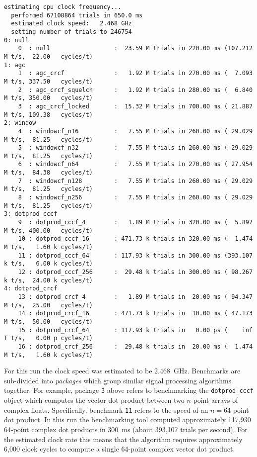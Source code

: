 \begin{Verbatim}[fontsize=\footnotesize]
  estimating cpu clock frequency...
  performed 67108864 trials in 650.0 ms
  estimated clock speed:   2.468 GHz
  setting number of trials to 246754
0: null
    0  : null                  :  23.59 M trials in 220.00 ms (107.212 M t/s,  22.00   cycles/t)
1: agc
    1  : agc_crcf              :   1.92 M trials in 270.00 ms (  7.093 M t/s, 337.50   cycles/t)
    2  : agc_crcf_squelch      :   1.92 M trials in 280.00 ms (  6.840 M t/s, 350.00   cycles/t)
    3  : agc_crcf_locked       :  15.32 M trials in 700.00 ms ( 21.887 M t/s, 109.38   cycles/t)
2: window
    4  : windowcf_n16          :   7.55 M trials in 260.00 ms ( 29.029 M t/s,  81.25   cycles/t)
    5  : windowcf_n32          :   7.55 M trials in 260.00 ms ( 29.029 M t/s,  81.25   cycles/t)
    6  : windowcf_n64          :   7.55 M trials in 270.00 ms ( 27.954 M t/s,  84.38   cycles/t)
    7  : windowcf_n128         :   7.55 M trials in 260.00 ms ( 29.029 M t/s,  81.25   cycles/t)
    8  : windowcf_n256         :   7.55 M trials in 260.00 ms ( 29.029 M t/s,  81.25   cycles/t)
3: dotprod_cccf
    9  : dotprod_cccf_4        :   1.89 M trials in 320.00 ms (  5.897 M t/s, 400.00   cycles/t)
    10 : dotprod_cccf_16       : 471.73 k trials in 320.00 ms (  1.474 M t/s,   1.60 k cycles/t)
    11 : dotprod_cccf_64       : 117.93 k trials in 300.00 ms (393.107 k t/s,   6.00 k cycles/t)
    12 : dotprod_cccf_256      :  29.48 k trials in 300.00 ms ( 98.267 k t/s,  24.00 k cycles/t)
4: dotprod_crcf
    13 : dotprod_crcf_4        :   1.89 M trials in  20.00 ms ( 94.347 M t/s,  25.00   cycles/t)
    14 : dotprod_crcf_16       : 471.73 k trials in  10.00 ms ( 47.173 M t/s,  50.00   cycles/t)
    15 : dotprod_crcf_64       : 117.93 k trials in   0.00 ps (    inf T t/s,   0.00 p cycles/t)
    16 : dotprod_crcf_256      :  29.48 k trials in  20.00 ms (  1.474 M t/s,   1.60 k cycles/t)
\end{Verbatim}
%
For this run the clock speed was estimated to be 2.468~GHz.
Benchmarks are sub-divided into {\em packages} which group similar
signal processing algorithms together.
For example, package {\tt 3} above refers to benchmarking the
{\tt dotprod\_cccf} object which computes the vector dot product
between two $n$-point arrays of complex floats.
Specifically, benchmark {\tt 11} refers to the speed of an $n=64$-point
dot product.
In this run the benchmarking tool computed approximately 117,930
64-point complex dot products in 300~ms
(about 393,107 trials per second).
For the estimated clock rate this means that the algorithm requires
approximately 6,000 clock cycles to compute
a single 64-point complex vector dot product.

